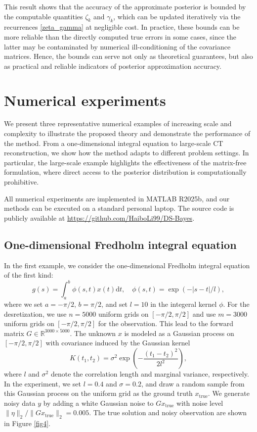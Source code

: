 \documentclass[]{myarticle}
\begin{document}
This result shows that the accuracy of the approximate posterior is bounded by the computable quantities $\zeta_k$ and $\gamma_k$, which can be updated iteratively via the recurrences \cref{zeta_gamma} at negligible cost. In practice, these bounds can be more reliable than the directly computed true errors in some cases, since the latter may be contaminated by numerical ill-conditioning of the covariance matrices. Hence, the bounds can serve not only as theoretical guarantees, but also as practical and reliable indicators of posterior approximation accuracy.


\section{Numerical experiments} \label{sec5}
We present three representative numerical examples of increasing scale and complexity to illustrate the proposed theory and demonstrate the performance of the method. From a one-dimensional integral equation to large-scale CT reconstruction, we show how the method adapts to different problem settings. In particular, the large-scale example highlights the effectiveness of the matrix-free formulation, where direct access to the posterior distribution is computationally prohibitive.

All numerical experiments are implemented in MATLAB R2025b, and our methods can be executed on a standard personal laptop. The source code is publicly available at \url{https://github.com/HaiboLi99/DS-Bayes}.

\subsection{One-dimensional Fredholm integral equation}
In the first example, we consider the one-dimensional Fredholm integral equation of the first kind:
\begin{equation}
  g(s) = \int_{a}^{b}\phi(s,t)x(t)\mathrm{d}t,  \quad \phi(s,t) = \exp\left(-|s-t|/l \right),
\end{equation}
where we set $a=-\pi/2$, $b=\pi/2$, and set $l=10$ in the integeral kernel $\phi$. For the desretization, we use $n=5000$ uniform grids on $[-\pi/2, \pi/2]$ and use $m=3000$ uniform grids on $[-\pi/2, \pi/2]$ for the observation. This lead to the forward matrix $G\in\mathbb{R}^{3000\times 5000}$. The unknown $x$ is modeled as a Gaussian process on $[-\pi/2,\pi/2]$ with covariance induced by the Gaussian kernel 
\begin{equation}
  K(t_1,t_2) = \sigma^2\exp\left(-\frac{(t_1-t_2)^2}{2l^2}\right),
\end{equation}
where $l$ and $\sigma^2$ denote the correlation length and marginal variance, respectively. In the experiment, we set $l=0.4$ and $\sigma=0.2$, and draw a random sample from this Gaussian process on the uniform grid as the ground truth $x_{\text{true}}$. We generate noisy data $y$ by adding a white Gaussian noise to $Gx_{\mathrm{true}}$ with noise level $\|\eta\|_2 / \|Gx_{\mathrm{true}}\|_2=0.005$. The true solution and noisy observation are shown in Figure \ref{fig4}.  
\end{document}

